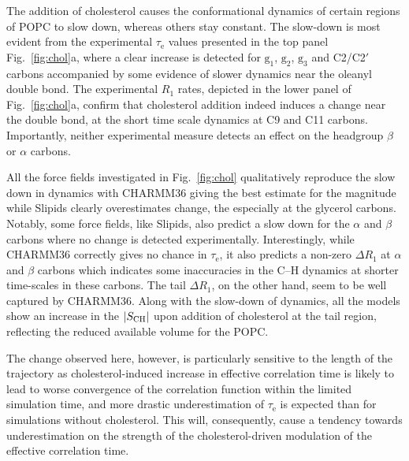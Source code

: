 \documentclass[journal=jpcbfk,manuscript=article,layout=twocolumn]{achemso}
\begin{document}
The addition of cholesterol causes the conformational dynamics of certain regions of POPC to slow down, whereas others stay constant. The slow-down is most evident from the experimental $\tau_\mathrm{e}$ values presented in the top panel Fig.~\ref{fig:chol}a, where a clear increase is detected for $\mathrm g_{1}$, $\mathrm g_{2}$, $\mathrm g_{3}$ and C2/C2$'$ carbons accompanied by some evidence of slower dynamics near the oleanyl double bond. The experimental $R_{1}$ rates, depicted in the lower panel of Fig.~\ref{fig:chol}a,  confirm that cholesterol addition indeed induces a change near the double bond, at the short time scale dynamics at C9 and C11 carbons. Importantly, neither experimental measure detects an effect on the headgroup $\beta$ or $\alpha$ carbons. 

All the force fields investigated in Fig.~\ref{fig:chol} qualitatively reproduce the slow down in dynamics with CHARMM36 giving the best estimate for the magnitude while Slipids clearly overestimates change, the especially at the glycerol carbons. Notably, some force fields, like Slipids, also predict a slow down for the $\alpha$ and $\beta$ carbons where no change is detected experimentally. Interestingly,  while CHARMM36 correctly gives no chance in $\tau_\mathrm{e}$, it also predicts a non-zero $\Delta R_{1}$ at $\alpha$ and $\beta$ carbons which indicates some inaccuracies in the C--H dynamics at shorter time-scales in these carbons. The tail $\Delta R_{1}$, on the other hand, seem to be well captured by CHARMM36. Along with the slow-down of dynamics, all the models show an increase in the $\vert S_{\rm{CH}}\vert$ upon addition of cholesterol at the tail region, reflecting the reduced available volume for the POPC.

The change observed here, however, is particularly sensitive to the length of the trajectory as cholesterol-induced increase in effective correlation time is likely to lead to worse convergence of the correlation function within the limited simulation time, and more drastic underestimation of $\tau_\mathrm{e}$ is expected than for simulations without cholesterol. This will, consequently, cause a tendency towards underestimation on the strength of the cholesterol-driven modulation of the effective correlation time.  
\end{document}
